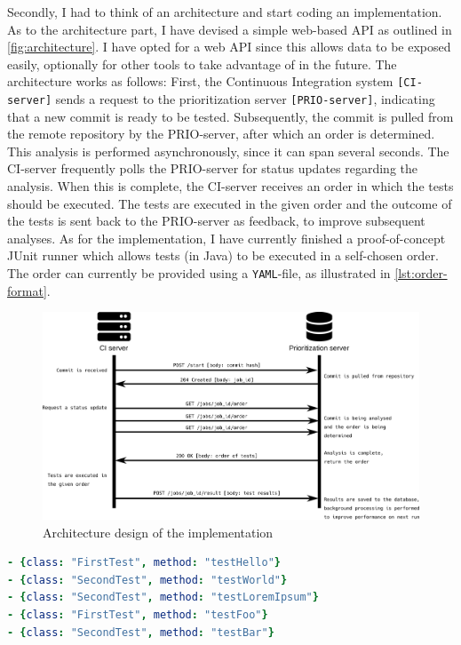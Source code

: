 \noindent Secondly, I had to think of an architecture and start coding an implementation. As to the architecture part, I have devised a simple web-based API as outlined in \autoref{fig:architecture}. I have opted for a web API since this allows data to be exposed easily, optionally for other tools to take advantage of in the future. The architecture works as follows: First, the Continuous Integration system \texttt{[CI-server]} sends a request to the prioritization server \texttt{[PRIO-server]}, indicating that a new commit is ready to be tested. Subsequently, the commit is pulled from the remote repository by the PRIO-server, after which an order is determined. This analysis is performed asynchronously, since it can span several seconds. The CI-server frequently polls the PRIO-server for status updates regarding the analysis. When this is complete, the CI-server receives an order in which the tests should be executed. The tests are executed in the given order and the outcome of the tests is sent back to the PRIO-server as feedback, to improve subsequent analyses. As for the implementation, I have currently finished a proof-of-concept JUnit runner which allows tests (in Java) to be executed in a self-chosen order. The order can currently be provided using a \texttt{YAML}-file, as illustrated in \autoref{lst:order-format}.

\begin{figure}[htbp]
	\includegraphics[width=\textwidth]{assets/architecture.pdf}
	\caption{Architecture design of the implementation}
	\label{fig:architecture}
\end{figure}

\begin{lstlisting}[caption=JUnit Order format, label=lst:order-format, language=yaml]
- {class: "FirstTest", method: "testHello"}
- {class: "SecondTest", method: "testWorld"}
- {class: "SecondTest", method: "testLoremIpsum"}
- {class: "FirstTest", method: "testFoo"}
- {class: "SecondTest", method: "testBar"}
\end{lstlisting}

